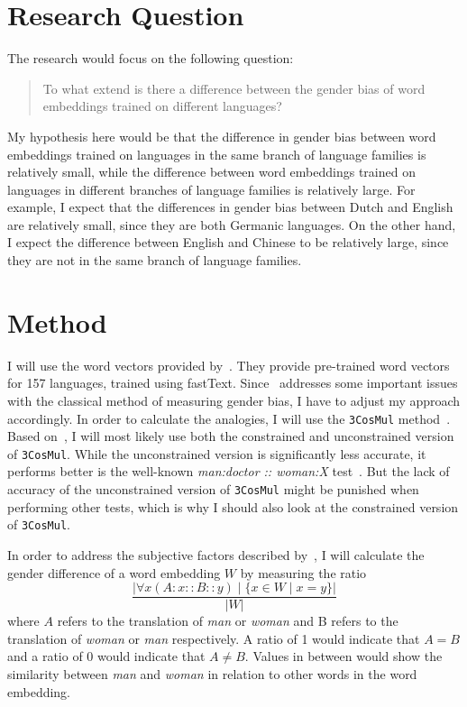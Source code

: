 \documentclass[english, a4paper, 11pt]{article}
\begin{document}
\section*{Research Question}
The research would focus on the following question:

\begin{quote}
    To what extend is there a difference between the gender bias of word embeddings
    trained on different languages?
\end{quote}

My hypothesis here would be that the difference in gender bias between word embeddings 
trained on languages in the same branch of language families is relatively small, while
the difference between word embeddings trained on languages in different branches of
language families is relatively large.
For example, I expect that the differences in gender bias between Dutch and English are
relatively small, since they are both Germanic languages. On the other hand, I expect the
difference between English and Chinese to be relatively large, since they are not in the
same branch of language families.

\section*{Method}
I will use the word vectors provided by~\cite{grave2018learning}. They provide
pre-trained word vectors for 157 languages, trained using fastText.
Since~\cite{2019arXiv190509866N} addresses some important issues with the classical method
of measuring gender bias, I have to adjust my approach accordingly.
In order to calculate the analogies, I will use the \texttt{3CosMul}
method~\cite{Levy14linguisticregularities}. Based on~\cite{2019arXiv190509866N},
I will most likely use both the constrained and unconstrained version of \texttt{3CosMul}.
While the unconstrained version is significantly less accurate, it performs better is the
well-known \textit{man:doctor :: woman:X} test~\cite{2019arXiv190509866N}.
But the lack of accuracy of the unconstrained version of \texttt{3CosMul} might be
punished when performing other tests, which is why I should also look at the constrained
version of \texttt{3CosMul}.

In order to address the subjective factors described by~\cite{2019arXiv190509866N}, I
will calculate the gender difference of a word embedding $W$ by measuring the ratio
$$
\frac{ |\forall x (A : x :: B :: y) \mid \{x \in W \mid x = y\}| } { |W| }
$$
where $A$ refers to the translation of \textit{man} or \textit{woman} and B refers to the translation of \textit{woman} or \textit{man} respectively.
A ratio of 1 would indicate that $A = B$ and a ratio of 0 would indicate that $A \neq B$.
Values in between would show the similarity between \textit{man} and \textit{woman} in relation to other words in the word embedding.
\end{document}
